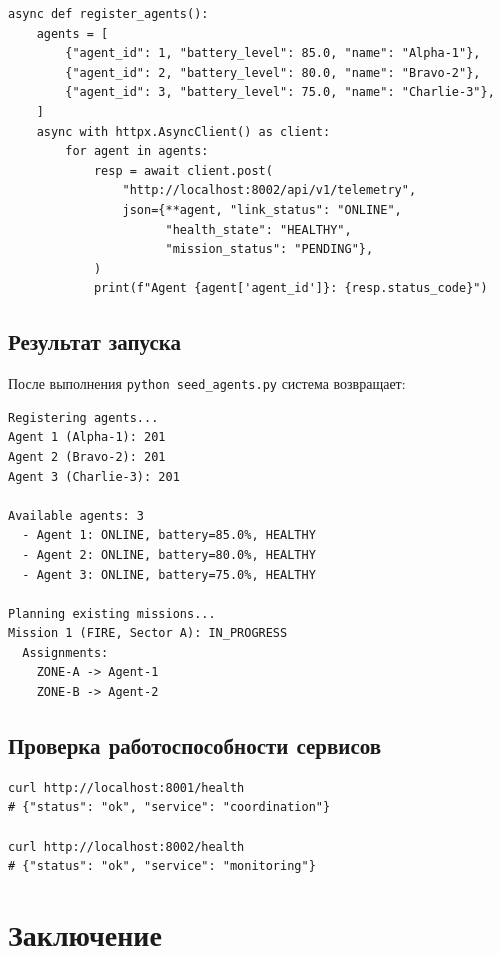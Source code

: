 \documentclass[12pt,a4paper]{article}
\begin{document}
\begin{lstlisting}[caption={seed\_agents.py (фрагмент)}]
async def register_agents():
    agents = [
        {"agent_id": 1, "battery_level": 85.0, "name": "Alpha-1"},
        {"agent_id": 2, "battery_level": 80.0, "name": "Bravo-2"},
        {"agent_id": 3, "battery_level": 75.0, "name": "Charlie-3"},
    ]
    async with httpx.AsyncClient() as client:
        for agent in agents:
            resp = await client.post(
                "http://localhost:8002/api/v1/telemetry",
                json={**agent, "link_status": "ONLINE",
                      "health_state": "HEALTHY",
                      "mission_status": "PENDING"},
            )
            print(f"Agent {agent['agent_id']}: {resp.status_code}")
\end{lstlisting}

\subsection{Результат запуска}

После выполнения \texttt{python seed\_agents.py} система возвращает:

\begin{lstlisting}[style=bash]
Registering agents...
Agent 1 (Alpha-1): 201
Agent 2 (Bravo-2): 201
Agent 3 (Charlie-3): 201

Available agents: 3
  - Agent 1: ONLINE, battery=85.0%, HEALTHY
  - Agent 2: ONLINE, battery=80.0%, HEALTHY
  - Agent 3: ONLINE, battery=75.0%, HEALTHY

Planning existing missions...
Mission 1 (FIRE, Sector A): IN_PROGRESS
  Assignments:
    ZONE-A -> Agent-1
    ZONE-B -> Agent-2
\end{lstlisting}

\subsection{Проверка работоспособности сервисов}

\begin{lstlisting}[style=bash, caption={Health-check запросы}]
curl http://localhost:8001/health
# {"status": "ok", "service": "coordination"}

curl http://localhost:8002/health
# {"status": "ok", "service": "monitoring"}
\end{lstlisting}

\section{Заключение}
\end{document}
